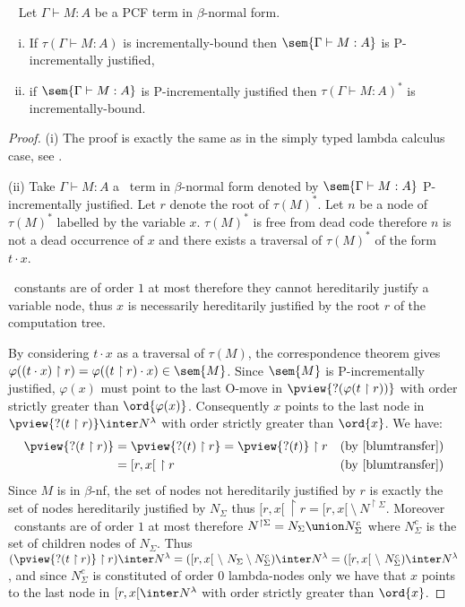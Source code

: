 \begin{proposition} \
\label{prop:incrbound_imp_incrjustified_pcf} Let $\Gamma \vdash M : A$ be a PCF term in $\beta$-normal form.
\begin{enumerate}[(i)]
\item  If $\tau(\Gamma \vdash M : A)$ is incrementally-bound then $\sem{\Gamma \vdash M : A}$ is P-incrementally justified,
\item  if $\sem{\Gamma \vdash M : A}$ is P-incrementally justified
then $\tau(\Gamma \vdash M : A)^*$ is incrementally-bound.
\end{enumerate}
\end{proposition}
\begin{proof}
(i) The proof is exactly the same as in the simply typed lambda calculus case,
see \cite[Proposition 4.1.5(i)]{blumtransfer}.

\noindent (ii)
Take $\Gamma \vdash M : A$ a \pcf\ term in $\beta$-normal form denoted by $\sem{\Gamma \vdash M : A}$ P-incrementally justified. Let $r$ denote the root of $\tau(M)^*$.
Let $n$ be a node of $\tau(M)^*$ labelled by the variable $x$.
$\tau(M)^*$ is free from dead code therefore $n$ is not a dead occurrence of $x$ and there exists a traversal of $\tau(M)^*$ of the form $t \cdot x$.

\pcf\ constants are of order $1$ at most therefore they cannot hereditarily justify a variable node, thus $x$ is necessarily hereditarily justified by the root $r$ of the computation tree.


By considering $t\cdot x$ as a traversal of $\tau(M)$,  the correspondence theorem gives $\varphi((t \cdot x) \upharpoonright r) = \varphi((t \upharpoonright r) \cdot x) \in \sem{M}$. Since $\sem{M}$ is P-incrementally justified, $\varphi(x)$ must point to the last O-move in $\pview{?(\varphi(t \upharpoonright
r))}$ with order strictly greater than $\ord{\varphi(x)}$.
Consequently $x$ points to the last node in $\pview{?(t
\upharpoonright r)} \inter N^{\lambda}$ with order strictly greater than $\ord{x}$. We have:
\begin{align*}
\pview{?(t \upharpoonright r)} &= \pview{?(t) \upharpoonright r} = \pview{?(t)} \upharpoonright r & (\mbox{by \cite[lemma 3.1.23]{blumtransfer}}) \\
& = [r,x[ \ \upharpoonright r & (\mbox{by \cite[proposition 3.1.20]{blumtransfer}})
\end{align*}
Since $M$ is in $\beta$-nf, the set of nodes not hereditarily justified by $r$ is exactly the set of nodes hereditarily justified by $N_{\Sigma}$ thus
$[r,x[ \ \upharpoonright r = [r,x[\ \setminus\  N^{\upharpoonright \Sigma}$.
Moreover \pcf\ constants are of order $1$ at most therefore $N^{\upharpoonright \Sigma} = N_{\Sigma} \union N^c_{\Sigma}$
where $N^c_{\Sigma}$ is the set of children nodes of $N_{\Sigma}$.
Thus $(\pview{?(t \upharpoonright r)}\upharpoonright r) \inter N^{\lambda} =
([r,x[\ \setminus\  N_{\Sigma} \setminus N^c_{\Sigma} ) \inter N^{\lambda} =
([r,x[\ \setminus\  N^c_{\Sigma} )  \inter N^{\lambda}$, and
since $N^c_{\Sigma}$ is constituted of order $0$ lambda-nodes only we have that
$x$ points to the last node in $[r,x[ \inter N^{\lambda}$ with order strictly greater than $\ord{x}$.


\end{proof}
